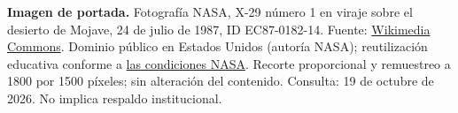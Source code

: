 \noindent\textbf{Imagen de portada.} Fotografía NASA,
X-29 número 1 en viraje sobre el desierto de Mojave,
24 de julio de 1987, ID EC87-0182-14. Fuente: \href{https://commons.wikimedia.org/wiki/File:X-29_in_Banked_Flight.jpg}{Wikimedia Commons}.
Dominio público en Estados Unidos (autoría NASA); reutilización educativa conforme a \href{https://www.nasa.gov/nasa-brand-center/images-and-media/}{las condiciones NASA}. Recorte proporcional y remuestreo a 1800 por 1500 píxeles; sin alteración del contenido. Consulta: 19 de octubre de 2026. No implica respaldo institucional.
